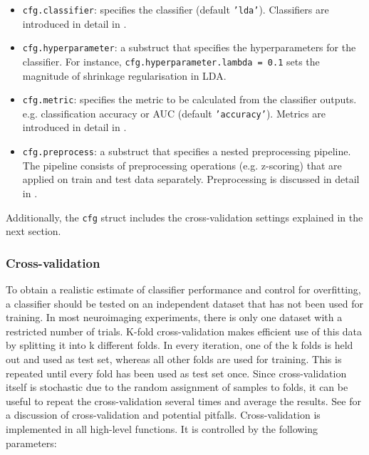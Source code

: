 \documentclass[utf8]{frontiersSCNS} %
\newcommand{\ttt}[1]{\texttt{#1}}
\begin{document}
\begin{itemize}
    \item \ttt{cfg.classifier}: specifies the classifier (default \ttt{'lda'}). Classifiers are introduced in detail in .
    \item \ttt{cfg.hyperparameter}: a substruct that specifies the hyperparameters for the classifier. For instance, \ttt{cfg.hyperparameter.lambda = 0.1} sets the magnitude of shrinkage regularisation in LDA.
    \item \ttt{cfg.metric}: specifies the metric to be calculated from the classifier outputs. e.g. classification accuracy or AUC (default \ttt{'accuracy'}). Metrics are introduced in detail in .
    \item \ttt{cfg.preprocess}: a substruct that specifies a nested preprocessing pipeline. The pipeline consists of preprocessing operations (e.g. z-scoring) that are applied on train and test data separately. Preprocessing is discussed in detail in .
\end{itemize}

Additionally, the \ttt{cfg} struct includes the cross-validation settings explained in the next section.


\subsubsection{Cross-validation}

To obtain a realistic estimate of classifier performance and control for overfitting, a classifier should be tested on an independent dataset that has not been used for training. In most neuroimaging experiments, there is only one dataset with a restricted number of trials. K-fold cross-validation makes efficient use of this data by splitting it into k different folds. In every iteration, one of the k folds is held out and used as test set, whereas all other folds are used for training. This is repeated until every fold has been used as test set once. Since cross-validation itself is stochastic due to the random assignment of samples to folds, it can be useful to repeat the cross-validation several times and average the results. See \cite{Lemm2011} for a discussion of cross-validation and potential pitfalls. Cross-validation is implemented in all high-level functions. It is controlled by the following parameters:
\end{document}
